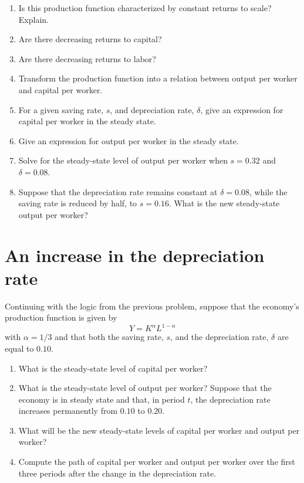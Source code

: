 \documentclass[]{book}
\begin{document}
\begin{enumerate}
\def\labelenumi{\arabic{enumi}.}
\item
  Is this production function characterized by constant returns to
  scale? Explain.
\item
  Are there decreasing returns to capital?
\item
  Are there decreasing returns to labor?
\item
  Transform the production function into a relation between output per
  worker and capital per worker.
\item
  For a given saving rate, \(s\), and depreciation rate, \(\delta\),
  give an expression for capital per worker in the steady state.
\item
  Give an expression for output per worker in the steady state.
\item
  Solve for the steady-state level of output per worker when \(s=0.32\)
  and \(\delta=0.08\).
\item
  Suppose that the depreciation rate remains constant at
  \(\delta=0.08\), while the saving rate is reduced by half, to
  \(s=0.16\). What is the new steady-state output per worker?
\end{enumerate}

\section{An increase in the depreciation
rate}\label{an-increase-in-the-depreciation-rate}

Continuing with the logic from the previous problem, suppose that the
economy's production function is given by \[Y=K^{\alpha}L^{1-\alpha}\]
with \(\alpha=1/3\) and that both the saving rate, \(s\), and the
depreciation rate, \(\delta\) are equal to \(0.10\).

\begin{enumerate}
\def\labelenumi{\arabic{enumi}.}
\item
  What is the steady-state level of capital per worker?
\item
  What is the steady-state level of output per worker? Suppose that the
  economy is in steady state and that, in period \(t\), the depreciation
  rate increases permanently from \(0.10\) to \(0.20\).
\item
  What will be the new steady-state levels of capital per worker and
  output per worker?
\item
  Compute the path of capital per worker and output per worker over the
  first three periods after the change in the depreciation rate.
\end{enumerate}
\end{document}
